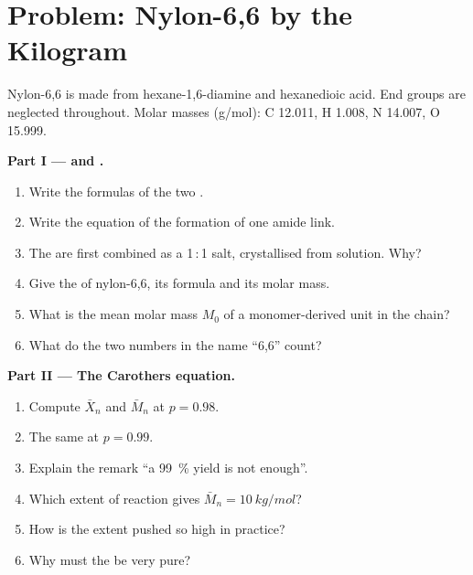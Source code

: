 \section{Problem: Nylon-6,6 by the Kilogram}

\begin{problem}
\label{pb:b2:polymer-synthesis:1}
Nylon-6,6 is made from hexane-1,6-diamine and hexanedioic acid. End groups are neglected throughout.
Molar masses (\unit{g/mol}): C 12.011, H 1.008, N 14.007, O 15.999.

\medskip
\noindent\textbf{Part I ---  and .}
\begin{enumerate}
  \item Write the formulas of the two .
  \item Write the equation of the formation of one amide link.
  \item The  are first combined as a 1\,:\,1 salt, crystallised from solution. Why?
  \item Give the  of nylon-6,6, its formula and its molar mass.
  \item What is the mean molar mass $M_0$ of a monomer-derived unit in the chain?
  \item What do the two numbers in the name ``6,6'' count?
\end{enumerate}

\medskip
\noindent\textbf{Part II --- The Carothers equation.}
\begin{enumerate}[resume]
  \item Compute $\bar X_n$ and $\bar M_n$ at $p = 0.98$.
  \item The same at $p = 0.99$.
  \item Explain the remark ``a 99~\% yield is not enough''.
  \item Which extent of reaction gives $\bar M_n = \qty{10}{kg/mol}$?
  \item How is the extent pushed so high in practice?
  \item Why must the  be very pure?
\end{enumerate}


\end{problem}
